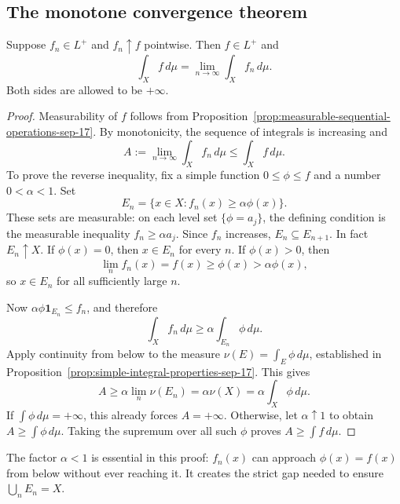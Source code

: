 \subsection{The monotone convergence theorem}

\begin{theorem}
  \label{thm:mct-sep-22}
  Suppose $f_n\in L^+$ and $f_n\uparrow f$ pointwise. Then $f\in L^+$
  and
  \[
    \int_X f\,d\mu=\lim_{n\to\infty}\int_X f_n\,d\mu.
  \]
  Both sides are allowed to be $+\infty$.
\end{theorem}

\begin{proof}
  Measurability of $f$ follows from
  Proposition~\ref{prop:measurable-sequential-operations-sep-17}.
  By monotonicity, the sequence of integrals is increasing and
  \[
    A:=\lim_{n\to\infty}\int_X f_n\,d\mu\leq\int_X f\,d\mu.
  \]
  To prove the reverse inequality, fix a simple function
  $0\leq\phi\leq f$ and a number $0<\alpha<1$. Set
  \[
    E_n=\{x\in X:f_n(x)\geq\alpha\phi(x)\}.
  \]
  These sets are measurable: on each level set $\{\phi=a_j\}$, the
  defining condition is the measurable inequality
  $f_n\geq\alpha a_j$. Since $f_n$ increases, $E_n\subseteq E_{n+1}$.
  In fact $E_n\uparrow X$. If $\phi(x)=0$, then $x\in E_n$ for every
  $n$. If $\phi(x)>0$, then
  \[
    \lim_n f_n(x)=f(x)\geq\phi(x)>\alpha\phi(x),
  \]
  so $x\in E_n$ for all sufficiently large $n$.

  Now $\alpha\phi\mathbf 1_{E_n}\leq f_n$, and therefore
  \[
    \int_X f_n\,d\mu\geq\alpha\int_{E_n}\phi\,d\mu.
  \]
  Apply continuity from below to the measure
  $\nu(E)=\int_E\phi\,d\mu$, established in
  Proposition~\ref{prop:simple-integral-properties-sep-17}. This gives
  \[
    A\geq\alpha\lim_n\nu(E_n)
      =\alpha\nu(X)=\alpha\int_X\phi\,d\mu.
  \]
  If $\int\phi\,d\mu=+\infty$, this already forces $A=+\infty$.
  Otherwise, let $\alpha\uparrow1$ to obtain $A\geq\int\phi\,d\mu$.
  Taking the supremum over all such $\phi$ proves
  $A\geq\int f\,d\mu$.
\end{proof}

\begin{remark}
  The factor $\alpha<1$ is essential in this proof: $f_n(x)$ can
  approach $\phi(x)=f(x)$ from below without ever reaching it. It
  creates the strict gap needed to ensure $\bigcup_n E_n=X$.
\end{remark}

